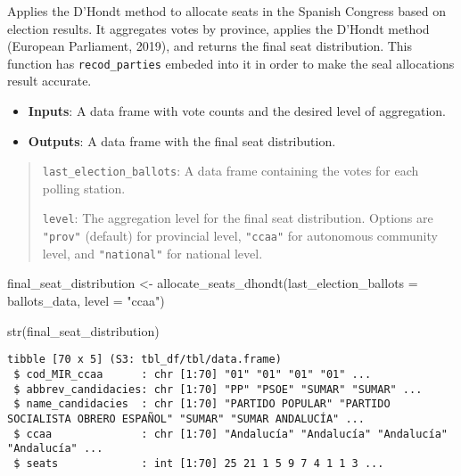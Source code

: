 \documentclass[
  letterpaper,
  DIV=11,
  numbers=noendperiod]{scrreprt}
\newenvironment{Shaded}{\begin{snugshade}}{\end{snugshade}}
\newcommand{\AttributeTok}[1]{\textcolor[rgb]{0.40,0.45,0.13}{#1}}
\newcommand{\FunctionTok}[1]{\textcolor[rgb]{0.28,0.35,0.67}{#1}}
\newcommand{\NormalTok}[1]{\textcolor[rgb]{0.00,0.23,0.31}{#1}}
\newcommand{\OtherTok}[1]{\textcolor[rgb]{0.00,0.23,0.31}{#1}}
\newcommand{\StringTok}[1]{\textcolor[rgb]{0.13,0.47,0.30}{#1}}
\providecommand{\tightlist}{%
  \setlength{\itemsep}{0pt}\setlength{\parskip}{0pt}}\usepackage{longtable,booktabs,array}
\begin{document}
Applies the D'Hondt method to allocate seats in the Spanish Congress
based on election results. It aggregates votes by province, applies the
D'Hondt method (European Parliament, 2019), and returns the final seat
distribution. This function has \texttt{recod\_parties} embeded into it
in order to make the seal allocations result accurate.

\begin{itemize}
\tightlist
\item
  \textbf{Inputs}: A data frame with vote counts and the desired level
  of aggregation.
\item
  \textbf{Outputs}: A data frame with the final seat distribution.
\end{itemize}

\begin{quote}
\texttt{last\_election\_ballots}: A data frame containing the votes for
each polling station.

\texttt{level}: The aggregation level for the final seat distribution.
Options are \texttt{"prov"} (default) for provincial level,
\texttt{"ccaa"} for autonomous community level, and \texttt{"national"}
for national level.
\end{quote}

\begin{Shaded}
\begin{Highlighting}[]
\NormalTok{final\_seat\_distribution }\OtherTok{\textless{}{-}} \FunctionTok{allocate\_seats\_dhondt}\NormalTok{(}\AttributeTok{last\_election\_ballots =}\NormalTok{ ballots\_data, }
                                                 \AttributeTok{level =} \StringTok{"ccaa"}\NormalTok{)}
\end{Highlighting}
\end{Shaded}

\begin{Shaded}
\begin{Highlighting}[]
\FunctionTok{str}\NormalTok{(final\_seat\_distribution)}
\end{Highlighting}
\end{Shaded}

\begin{verbatim}
tibble [70 x 5] (S3: tbl_df/tbl/data.frame)
 $ cod_MIR_ccaa      : chr [1:70] "01" "01" "01" "01" ...
 $ abbrev_candidacies: chr [1:70] "PP" "PSOE" "SUMAR" "SUMAR" ...
 $ name_candidacies  : chr [1:70] "PARTIDO POPULAR" "PARTIDO SOCIALISTA OBRERO ESPAÑOL" "SUMAR" "SUMAR ANDALUCÍA" ...
 $ ccaa              : chr [1:70] "Andalucía" "Andalucía" "Andalucía" "Andalucía" ...
 $ seats             : int [1:70] 25 21 1 5 9 7 4 1 1 3 ...
\end{verbatim}
\end{document}
